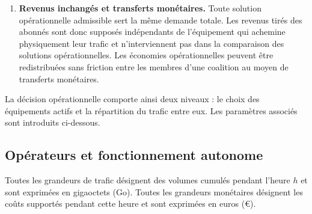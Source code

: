 \begin{enumerate}
    Le volume descendant horaire est utilisé comme indicateur de la charge
    servie, et les coefficients sont estimés à partir des couples mesurés de
    trafic et de puissance. Nous supposons que leur relation est
    approximativement affine sur le domaine observé. Cette hypothèse est
    évaluée dans la Section~\ref{sec:simulations_numeriques}.

    \item \textbf{Revenus inchangés et transferts monétaires.}
    Toute solution opérationnelle admissible sert la même demande totale. Les
    revenus tirés des abonnés sont donc supposés indépendants de
    l'équipement qui achemine physiquement leur trafic et n'interviennent
    pas dans la comparaison des solutions opérationnelles. Les économies
    opérationnelles peuvent être redistribuées sans friction entre les
    membres d'une coalition au moyen de transferts monétaires.
\end{enumerate}

La décision opérationnelle comporte ainsi deux niveaux : le choix des
équipements actifs et la répartition du trafic entre eux. Les
paramètres associés sont introduits ci-dessous.

\subsection{Opérateurs et fonctionnement autonome}

Toutes les grandeurs de trafic désignent des volumes cumulés pendant l'heure
\(h\) et sont exprimées en gigaoctets (\(\mathrm{Go}\)). Toutes les grandeurs
monétaires désignent les coûts supportés pendant cette heure et sont exprimées
en euros (\(\text{€}\)).

